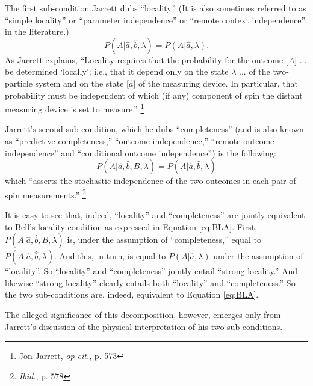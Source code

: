 \documentclass[aps,prc,twocolumn]{revtex4}
\begin{document}
The first sub-condition Jarrett dubs ``locality.''  (It is also
sometimes referred to as ``simple locality'' or ``parameter
independence'' or ``remote context independence'' in the literature.)
\begin{equation}
P(A | \hat{a},\hat{b}, \lambda) = P(A| \hat{a}, \lambda).
\label{eq:JL}
\end{equation}
As Jarrett explains, ``Locality requires that the probability for the 
outcome
[$A$] ... be determined `locally'; i.e., that it depend only on the
state $\lambda$ ... of the two-particle system and on the state
[$\hat{a}$] of the measuring device.  In particular, that probability
must be independent of which (if any) component of spin the distant
measuring device is set to measure.''  
\footnote{Jon Jarrett, \emph{op cit.}, p. 573}

Jarrett's second sub-condition, which he dubs ``completeness'' (and is
also known as ``predictive completeness,'' ``outcome
independence,'' ``remote outcome independence'' and ``conditional 
outcome independence'') is the following:  
\begin{equation}
P(A | \hat{a}, \hat{b}, B, \lambda) = P(A | \hat{a}, \hat{b}, \lambda)
\label{eq:JC}
\end{equation}
which ``asserts the stochastic independence of
the two outcomes in each pair of spin measurements.''
\footnote{\emph{Ibid.}, p. 578}

It is easy to see that, indeed, ``locality'' and ``completeness'' are
jointly equivalent to Bell's locality condition as expressed in
Equation \ref{eq:BLA}.  First, $P(A|\hat{a},\hat{b},B,\lambda)$ is,
under the assumption of ``completeness,'' equal to
$P(A|\hat{a},\hat{b}, \lambda)$.  And this, in turn, is equal to $P(A |
\hat{a}, \lambda)$ under the assumption of ``locality''.  So
``locality'' and ``completeness'' jointly entail ``strong locality.''
And likewise ``strong locality'' clearly entails both ``locality''
and ``completeness.''  So the two sub-conditions are, indeed,
equivalent to Equation \ref{eq:BLA}.  

The alleged significance of this decomposition, however, emerges
only from Jarrett's discussion of the physical interpretation of his
two sub-conditions.  
\end{document}
